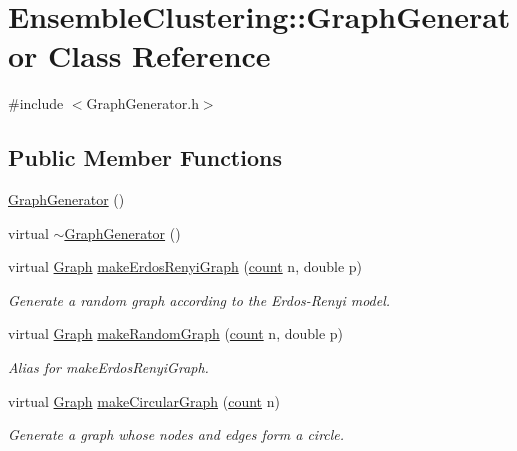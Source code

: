 \hypertarget{class_ensemble_clustering_1_1_graph_generator}{\section{Ensemble\-Clustering\-:\-:Graph\-Generator Class Reference}
\label{class_ensemble_clustering_1_1_graph_generator}
}


{\ttfamily \#include $<$Graph\-Generator.\-h$>$}

\subsection*{Public Member Functions}
\begin{DoxyCompactItemize}
\item 
\hyperlink{class_ensemble_clustering_1_1_graph_generator_a076eb95e34e465a0639844e79c79c4b0}{Graph\-Generator} ()
\item 
virtual \hyperlink{class_ensemble_clustering_1_1_graph_generator_a4f0b5374c64c6c81bf64e88a9b74b646}{$\sim$\-Graph\-Generator} ()
\item 
virtual \hyperlink{class_ensemble_clustering_1_1_graph}{Graph} \hyperlink{class_ensemble_clustering_1_1_graph_generator_ae3f01707491ceca4cdc6b87af45370ae}{make\-Erdos\-Renyi\-Graph} (\hyperlink{namespace_ensemble_clustering_a2482e94ca22a0c6544a5a9173186fde8}{count} n, double p)
\begin{DoxyCompactList}\small\item\em Generate a random graph according to the Erdos-\/\-Renyi model. \end{DoxyCompactList}\item 
virtual \hyperlink{class_ensemble_clustering_1_1_graph}{Graph} \hyperlink{class_ensemble_clustering_1_1_graph_generator_aec7e3e94b6e925077f7531da793a47a5}{make\-Random\-Graph} (\hyperlink{namespace_ensemble_clustering_a2482e94ca22a0c6544a5a9173186fde8}{count} n, double p)
\begin{DoxyCompactList}\small\item\em Alias for make\-Erdos\-Renyi\-Graph. \end{DoxyCompactList}\item 
virtual \hyperlink{class_ensemble_clustering_1_1_graph}{Graph} \hyperlink{class_ensemble_clustering_1_1_graph_generator_a6b1dfcef57d42bb6bccf2d15ea0aeac1}{make\-Circular\-Graph} (\hyperlink{namespace_ensemble_clustering_a2482e94ca22a0c6544a5a9173186fde8}{count} n)
\begin{DoxyCompactList}\small\item\em Generate a graph whose nodes and edges form a circle. \end{DoxyCompactList}\item 

\end{DoxyCompactItemize}
